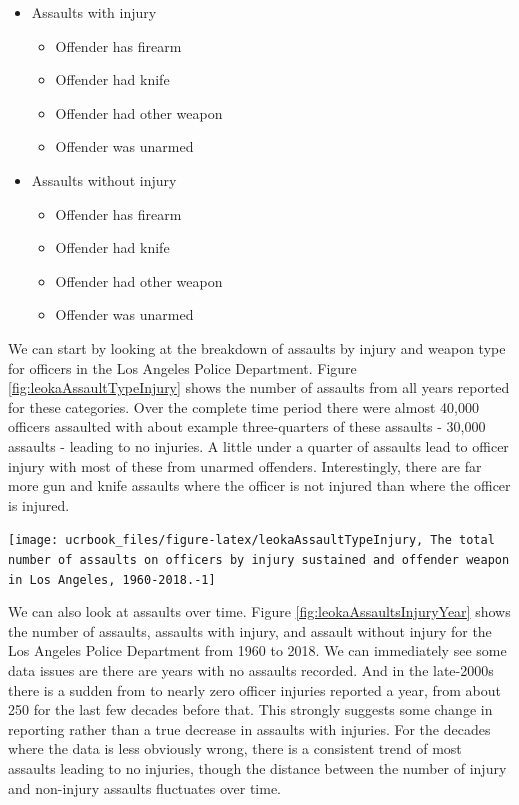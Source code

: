 \documentclass[
  12pt,
  openany]{book}
\providecommand{\tightlist}{%
  \setlength{\itemsep}{0pt}\setlength{\parskip}{0pt}}
\begin{document}
\begin{itemize}
\tightlist
\item
  Assaults with injury

  \begin{itemize}
  \tightlist
  \item
    Offender has firearm
  \item
    Offender had knife
  \item
    Offender had other weapon
  \item
    Offender was unarmed
  \end{itemize}
\item
  Assaults without injury

  \begin{itemize}
  \tightlist
  \item
    Offender has firearm
  \item
    Offender had knife
  \item
    Offender had other weapon
  \item
    Offender was unarmed
  \end{itemize}
\end{itemize}

We can start by looking at the breakdown of assaults by injury and weapon type for officers in the Los Angeles Police Department. Figure \ref{fig:leokaAssaultTypeInjury} shows the number of assaults from all years reported for these categories. Over the complete time period there were almost 40,000 officers assaulted with about example three-quarters of these assaults - 30,000 assaults - leading to no injuries. A little under a quarter of assaults lead to officer injury with most of these from unarmed offenders. Interestingly, there are far more gun and knife assaults where the officer is not injured than where the officer is injured.

\begin{center}\texttt{[image: ucrbook\_files/figure-latex/leokaAssaultTypeInjury, The total number of assaults on officers by injury sustained and offender weapon in Los Angeles, 1960-2018.-1]} \end{center}

We can also look at assaults over time. Figure \ref{fig:leokaAssaultsInjuryYear} shows the number of assaults, assaults with injury, and assault without injury for the Los Angeles Police Department from 1960 to 2018. We can immediately see some data issues are there are years with no assaults recorded. And in the late-2000s there is a sudden from to nearly zero officer injuries reported a year, from about 250 for the last few decades before that. This strongly suggests some change in reporting rather than a true decrease in assaults with injuries. For the decades where the data is less obviously wrong, there is a consistent trend of most assaults leading to no injuries, though the distance between the number of injury and non-injury assaults fluctuates over time.
\end{document}
